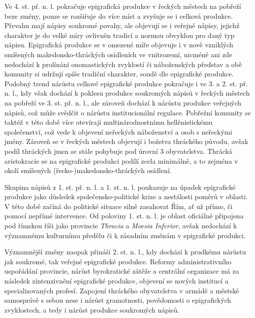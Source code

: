Ve 4. st. př. n. l. pokračuje epigrafická produkce v řeckých městech na pobřeží beze změny, pouze se rozšiřuje do více míst a zvyšuje se i celková produkce. Převahu mají nápisy soukromé povahy, ale objevují se i veřejné nápisy, jejichž charakter je do velké míry ovlivněn tradicí a normou obvyklou pro daný typ nápisu. Epigrafická produkce se v omezené míře objevuje i v nově vzniklých smíšených makedonsko-thráckých osídleních ve vnitrozemí, nicméně ani zde nedochází k prolínání onomastických zvyklostí či náboženských představ a obě komunity si udržují spíše tradiční charakter, soudě dle epigrafické produkce. Podobný trend nárůstu celkové epigrafické produkce pokračuje i ve 3. a 2. st. př. n. l., kdy však dochází k poklesu produkce soukromých nápisů v řeckých městech na pobřeží ve 3. st. př. n. l., ale zároveň dochází k nárůstu produkce veřejných nápisů, což může svědčit o nárůstu institucionální regulace. Pobřežní komunity se taktéž v této době více otevírají multinárodnostnímu hellénistickému společenství, což vede k objevení neřeckých náboženství a osob s neřeckými jmény. Zároveň se v řeckých městech objevují i božstva thráckého původu, avšak podíl thráckých jmen se stále pohybuje pod úrovní 3  obyvatelstva. Thrácká aristokracie se na epigrafické produkci podílí zcela minimálně, a to zejména v okolí smíšených (řecko-)makedonsko-thráckých osídlení.

Skupina nápisů z 1. st. př. n. l. a 1. st. n. l. poukazuje na úpadek epigrafické produkce jako důsledek společensko-politické krize a nestálosti poměrů v oblasti. V této době začíná do politické situace silně zasahovat Řím, ať už přímo, či pomocí nepřímé intervence. Od poloviny 1. st. n. l. je oblast oficiálně připojena pod římskou říši jako provincie {\em Thracia} a {\em Moesia Inferior}, avšak nedochází k významnému kulturnímu předělu či k zásadním změnám v epigrafické produkci.

Významnější změny naopak přináší 2. st. n. l., kdy dochází k prudkému nárůstu jak soukromé, tak veřejné epigrafické produkce. Reformy administrativního uspořádání provincie, nárůst byrokratické zátěže a centrální organizace má za následek zintenzivnění epigrafické produkce, objevení se nových institucí a specializovaných profesí. Zapojení thráckého obyvatelstva v armádě a městské samosprávě s sebou nese i nárůst gramotnosti, povědomosti o epigrafických zvyklostech, a tedy i nárůst produkce soukromých nápisů.

